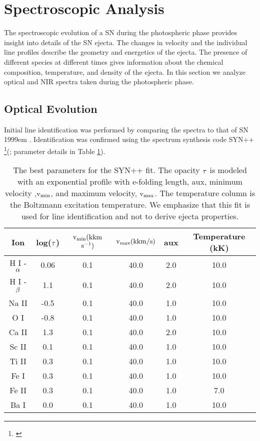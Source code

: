 \documentclass[a4paper,fleqn,usenatbib]{mnras}
\begin{document}
\section{Spectroscopic Analysis} \label{sec:SpecEvolve}
The spectroscopic evolution of a SN during the photospheric phase provides insight into details of the SN ejecta.
The changes in velocity and the individual line profiles describe the geometry and energetics of the ejecta. 
The presence of different species at different times gives information about the chemical composition, temperature, and density of the ejecta.
In this section we analyze optical and NIR spectra taken during the photospheric phase.
\subsection{Optical Evolution} \label{OpticalEvolve}
Initial line identification was performed by comparing the spectra to that of SN 1999em \citep{2001leonard}. 
Identification was confirmed using the spectrum synthesis code SYN++ \footnote{\citet{2013thomas}}(\citealt{2011thomas}; parameter details in Table \ref{tab:syn++}). 
\begin{table*}
\caption{The best parameters for the SYN++ fit. 
The opacity $\rm{\tau}$ is modeled with an exponential profile with e-folding length, aux, minimum velocity ,$\rm{v_{min}}$, and maximum velocity, $\rm{v_{max}}$. 
The temperature column is the Boltzmann excitation temperature.
We emphasize that this fit is used for line identification and not to derive ejecta properties.}
\begin{center}
\begin{tabular}{c|c|c|c|c|c}
\hline
Ion & log($\rm{\tau}$) & $\rm{v_{min}(kkm}$ $\rm{s^{-1})}$ & $\rm{v_{max}(kkm/s)}$ & aux & Temperature (kK) \\
\hline
  H I -$\rm{\alpha}$   & 0.06 & 0.1 & 40.0 & 2.0 & 10.0 \\
  H I - $\rm{\beta}$   & 1.1& 0.1 & 40.0 & 2.0 & 10.0 \\
  Na II & -0.5 & 0.1 & 40.0 & 1.0 & 10.0 \\
  O I & -0.8 & 0.1 & 40.0 & 1.0 & 10.0 \\
  Ca II & 1.3 & 0.1 & 40.0 & 2.0 & 10.0 \\
  Sc II & 0.1 & 0.1 & 40.0 & 1.0 & 10.0 \\
  Ti II  & 0.3 & 0.1 & 40.0 & 1.0 & 10.0 \\
  Fe I  &  0.3 & 0.1 & 40.0 & 1.0 & 10.0 \\
  Fe II & 0.3 & 0.1 & 40.0 & 1.0 & 7.0 \\
  Ba I & 0.0 & 0.1 & 40.0 & 1.0 & 10.0 \\  
  \hline
 \end{tabular}
\end{center}
\label{tab:syn++}
\end{table*}
\end{document}
